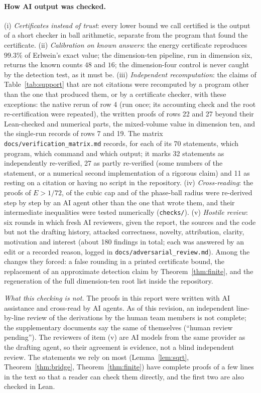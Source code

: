 \documentclass[11pt]{article}
\newcommand{\E}{E}                       %
\theoremstyle{definition}
\theoremstyle{remark}
\begin{document}
\paragraph{How AI output was checked.}
(i) \emph{Certificates instead of trust}: every lower bound we call certified is the output of a short checker in
ball arithmetic, separate from the program that found the certificate.
(ii) \emph{Calibration on known answers}: the energy certificate reproduces $99.3\%$ of Erlwein's exact
value; the dimension-ten pipeline, run in dimension six, returns the known counts $48$ and $16$; the
dimension-four control is never caught by the detection test, as it must be.
(iii) \emph{Independent recomputation}: the claims of Table~\ref{tab:support} that are not citations were
recomputed by a program other than the one that produced them, or by a certificate checker, with these exceptions:
the native rerun of row 4 (run once; its accounting check and the root re-certification were repeated), the written proofs
of rows 22 and 27 beyond their Lean-checked and numerical parts, the mixed-volume value in dimension ten, and the single-run records of rows 7 and 19. The
matrix \texttt{docs/verification\_matrix.md} records, for each of its 70 statements, which program, which command
and which output; it marks 32 statements as independently re-verified, 27 as partly re-verified (some numbers of
the statement, or a numerical second implementation of a rigorous claim) and 11 as resting on a citation or having no script in the repository.
(iv) \emph{Cross-reading}: the proofs of $\E>1/72$, of the cubic cap and of the phase-ball radius were re-derived
step by step by an AI agent other than the one that wrote them, and their
intermediate inequalities were tested numerically (\texttt{checks/}).
(v) \emph{Hostile review}: six rounds in which fresh AI reviewers, given the report, the sources and the code
but not the drafting history, attacked correctness, novelty, attribution, clarity, motivation and interest (about
180 findings in total; each was answered by an edit or a recorded reason, logged in
\texttt{docs/adversarial\_review.md}). Among the changes they forced: a false rounding in a printed certificate bound, the
replacement of an approximate detection claim by Theorem~\ref{thm:finite}, and the regeneration of the full
dimension-ten root list inside the repository.

\emph{What this checking is not.} The proofs in this report were written with AI assistance and cross-read by AI
agents. As of this revision, an independent line-by-line review of the derivations by the human team members is
not complete; the supplementary documents say the same of themselves (``human review pending''). The reviewers of
item (v) are AI models from the same provider as the drafting agent, so their agreement is evidence, not a blind
independent review. The statements we rely on most (Lemma~\ref{lem:sqrt}, Theorem~\ref{thm:bridge},
Theorem~\ref{thm:finite}) have complete proofs of a few lines in the text so that a reader can check them
directly, and the first two are also checked in Lean.
\end{document}
